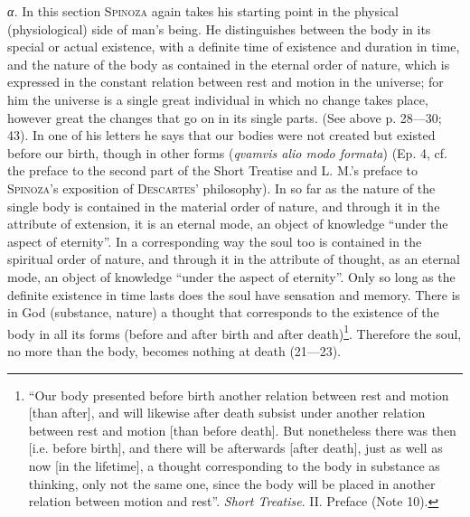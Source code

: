 \documentclass[12pt]{article}
\begin{document}
\textit{α.} In this section \textsc{Spinoza} again takes his starting point in the physical
(physiological) side of man's being. He distinguishes between the body in its special or actual
existence, with a definite time of existence and duration in time, and the nature of the body as
contained in the eternal order of nature, which is expressed in the constant relation between rest
and motion in the universe; for him the universe is a single great individual in which no change
takes place, however great the changes that go on in its single parts. (See above p. 28---30; 43).
In one of his letters he says that our bodies were not created but existed before our birth,
though in other forms (\textit{qvamvis alio modo formata}) (Ep. 4, cf. the preface to the second
part of the Short Treatise and L. M.'s preface to \textsc{Spinoza}'s exposition of
\textsc{Descartes}' philosophy). In so far as the nature of the single body is contained in the
material order of nature, and through it in the attribute of extension, it is an eternal mode, an
object of knowledge ``under the aspect of eternity''. In a corresponding way the soul too is
contained in the spiritual order of nature, and through it in the attribute of thought, as an
eternal mode, an object of knowledge ``under the aspect of eternity''. Only so long as the definite
existence in time lasts does the soul have sensation and memory. There is in God (substance,
nature) a thought that corresponds to the existence of the body in all its forms (before and after
birth and after death)\footnote{``Our body presented before birth another relation between rest and
motion [than after], and will likewise after death subsist under another relation between rest and
motion [than before death]. But nonetheless there was then [i.e. before birth], and there will be
afterwards [after death], just as well as now [in the lifetime], a thought corresponding to the
body in substance as thinking, only not the same one, since the body will be placed in another
relation between motion and rest''. \textit{Short Treatise}. II. Preface (Note 10).}. Therefore the
soul, no more than the body, becomes nothing at death (21---23).
\end{document}
